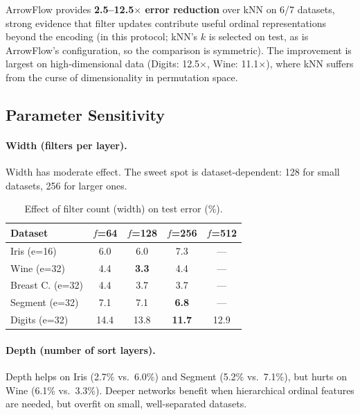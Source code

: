 \documentclass[12pt]{article}
\begin{document}
ArrowFlow provides \textbf{2.5--12.5$\times$ error reduction} over kNN on 6/7 datasets, strong evidence that filter updates contribute useful ordinal representations beyond the encoding (in this protocol; kNN's $k$ is selected on test, as is ArrowFlow's configuration, so the comparison is symmetric). The improvement is largest on high-dimensional data (Digits: 12.5$\times$, Wine: 11.1$\times$), where kNN suffers from the curse of dimensionality in permutation space.

\subsection{Parameter Sensitivity}

\paragraph{Width (filters per layer).}
Width has moderate effect. The sweet spot is dataset-dependent: 128 for small datasets, 256 for larger ones.

\begin{table}[ht]
\centering
\caption{Effect of filter count (width) on test error (\%).}
\label{tab:width}
\begin{tabular}{lcccc}
\toprule
Dataset & $f$=64 & $f$=128 & $f$=256 & $f$=512 \\
\midrule
Iris (e=16)         & 6.0 & 6.0 & 7.3 & --- \\
Wine (e=32)         & 4.4 & \textbf{3.3} & 4.4 & --- \\
Breast C. (e=32)    & 4.4 & 3.7 & 3.7 & --- \\
Segment (e=32)      & 7.1 & 7.1 & \textbf{6.8} & --- \\
Digits (e=32)       & 14.4 & 13.8 & \textbf{11.7} & 12.9 \\
\bottomrule
\end{tabular}
\end{table}

\paragraph{Depth (number of sort layers).}
Depth helps on Iris (2.7\% vs.\ 6.0\%) and Segment (5.2\% vs.\ 7.1\%), but hurts on Wine (6.1\% vs.\ 3.3\%). Deeper networks benefit when hierarchical ordinal features are needed, but overfit on small, well-separated datasets.
\end{document}
